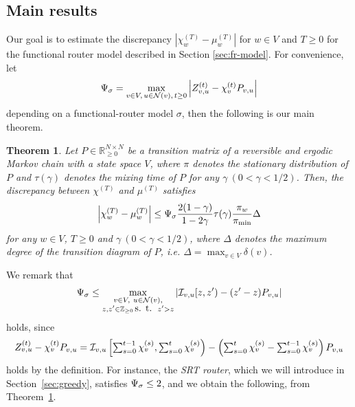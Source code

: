 \documentclass[letter, 11pt]{article}
\newcommand{\1}{\mbox{1}\hspace{-0.25em}\mbox{l}}
\newcommand{\I}{{\cal I}} \newcommand{\C}{{\cal C}} \newcommand{\dtv}{{\cal D}_{\rm tv}}
\newtheorem{theorem}{Theorem}[section]
\begin{document}
\subsection{Main results}\label{subsec:main_results}
Our goal is to estimate the discrepancy $|\chi^{(T)}_w - \mu^{(T)}_w |$ 
for $w \in V$ and $T \geq 0$ for the functional router model described in Section \ref{sec:fr-model}. 
For convenience, let 
\begin{eqnarray}
\label{def:dsigma}
\Psi_\sigma = \max_{\substack{v\in V, \, u \in {\cal N}(v), \, t \geq 0}}\left| Z_{v, u}^{(t)}-\chi_v^{(t)} P_{v, u}\right|
\end{eqnarray}
depending on a functional-router model $\sigma$, then the following is our main theorem. 
\begin{theorem}
\label{thm:mixupper-vertexds}
 Let $P \in \mathbb{R}_{\geq 0}^{N \times N}$ be a transition matrix of 
  a {\em reversible} and ergodic Markov chain with a state space $V$, where $\pi$ denotes the stationary distribution of $P$ and $\tau(\gamma)$ denotes the mixing time of $P$ for any $\gamma\ (0<\gamma<1/2)$. 
Then, the discrepancy between $\chi^{(T)}$ and $\mu^{(T)}$ satisfies
\begin{eqnarray*}
\left|\chi_w^{(T)}-\mu_w^{(T)}\right|
\leq \Psi_\sigma \frac{2(1-\gamma )}{1-2\gamma }\tau(\gamma )\frac{\pi_w}{\pi_{\min}}\Delta 
\end{eqnarray*}
for any $w\in V$, $T\geq 0$ and $\gamma\ (0 < \gamma < 1/2)$, where $\Delta$ denotes the maximum degree of the transition diagram of $P$, {\rm i.e.} $\Delta=\max_{v\in V}\delta(v)$. 
\end{theorem}
We remark that 
\begin{eqnarray}
\label{eq:dsigmabound}
 \dsig 
 \leq 
 \max_{\substack{v\in V, \ u\in {\cal N}(v), \\ z, z' \in \mathbb{Z}_{\geq 0} \, \mbox{s. t. }\, z'>z }}
 \left| \I_{v, u}[z, z')-(z'-z)  P_{v,u}\right|
\end{eqnarray}
 holds, 
 since 
\begin{eqnarray*}\textstyle
 \Z_{v, u}^{(t)}-\chi_v^{(t)} P_{v,u} 
 = \textstyle
  \I_{v, u}\left[ \sum_{s=0}^{t-1} \chi_v^{(s)}, \sum_{s=0}^{t} \chi_v^{(s)} \right) 
- \left(\sum_{s=0}^{t} \chi_v^{(s)} - \sum_{s=0}^{t-1} \chi_v^{(s)} \right) P_{v,u}
\end{eqnarray*}
 holds by the definition. For instance, the {\em SRT router}, which we will introduce in Section~\ref{sec:greedy}, satisfies $\Psi_\sigma\leq 2$, and we obtain the following, from Theorem~\ref{thm:mixupper-vertexds}. 
\end{document}
